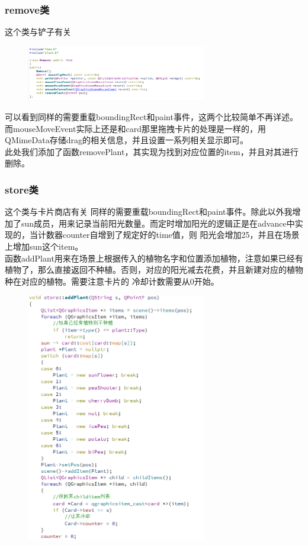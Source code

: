 \documentclass[12pt,a4paper,UTF8]{article}
\begin{document}
    \subsubsection{remove类}
    这个类与铲子有关
    \begin{figure}[H]
      \centering
    \includegraphics[width=0.7\textwidth]{figure/remove.png}
    \end{figure}
    可以看到同样的需要重载boundingRect和paint事件，这两个比较简单不再详述。
    而mouseMoveEvent实际上还是和card那里拖拽卡片的处理是一样的，用QMimeData存储drag的相关信息，并且设置一系列相关显示即可。\\
    此处我们添加了函数removePlant，其实现为找到对应位置的item，并且对其进行删除。

    \subsubsection{store类}
    这个类与卡片商店有关
    同样的需要重载boundingRect和paint事件。除此以外我增加了sun成员，用来记录当前阳光数量。而定时增加阳光的逻辑正是在advance中实现的，当计数器counter自增到了规定好的time值，则
    阳光会增加25，并且在场景上增加sun这个item。\\
    函数addPlant用来在场景上根据传入的植物名字和位置添加植物，注意如果已经有植物了，那么直接返回不种植。否则，对应的阳光减去花费，并且新建对应的植物种在对应的植物。需要注意卡片的
    冷却计数需要从0开始。
    \begin{figure}[H]
      \centering
    \includegraphics[width=0.7\textwidth]{figure/addPlant.png}
    \end{figure}
\end{document}
